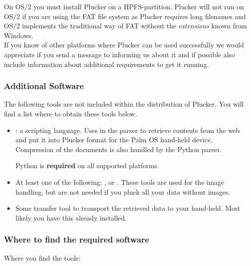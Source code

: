 \note{} On OS/2 you must install Plucker on a HPFS-partition. Plucker
will not run on OS/2 if you are using the FAT file system as Plucker
requires long filenames and OS/2 implements the traditional way of FAT
without the \emph{extensions} known from Windows.\\

If you know of other platforms where Plucker can be used successfully
we would appreciate if you send a message to \devaddress{} informing us
about it and if possible also include information about additional
requirements to get it running.

\subsubsection{Additional Software}

The following tools are not included within the distribution of
Plucker. You will find a list where to obtain these tools below.

\begin{itemize}
  \item {}: a scripting language. Uses in the parser
  to retrieve contents from the web and put it into Plucker format
  for the Palm OS hand-held device. Compression of the documents is also
  handled by the Python parser.

  Python is {\bf required} on all supported platforms. 

  \item At least one of the following: ,
   or . These tools are used for the image
  handling, but are not needed if you pluck all your data without images.

  \item Some transfer tool to transport the retrieved data to your
  hand-held. Most likely you have this already installed.

\end{itemize}

\subsubsection{Where to find the required software}

Where you find the tools:

